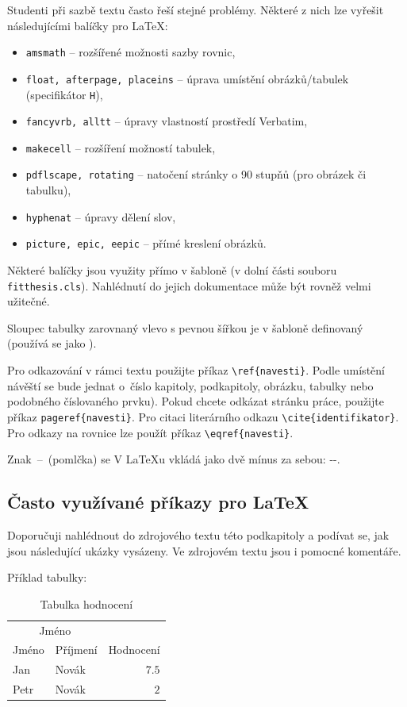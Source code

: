 Studenti při sazbě textu často řeší stejné problémy. Některé z nich lze vyřešit následujícími balíčky pro \LaTeX:

\begin{itemize}
  \item \verb|amsmath| -- rozšířené možnosti sazby rovnic,
  \item \verb|float, afterpage, placeins| -- úprava umístění obrázků/tabulek (specifikátor \texttt{H}),
  \item \verb|fancyvrb, alltt| -- úpravy vlastností prostředí Verbatim, 
  \item \verb|makecell| -- rozšíření možností tabulek,
  \item \verb|pdflscape, rotating| -- natočení stránky o 90 stupňů (pro obrázek či tabulku),
  \item \verb|hyphenat| -- úpravy dělení slov,
  \item \verb|picture, epic, eepic| -- přímé kreslení obrázků.
\end{itemize}

Některé balíčky jsou využity přímo v šabloně (v dolní části souboru \texttt{fitthesis.cls}). Nahlédnutí do jejich dokumentace může být rovněž velmi užitečné.

Sloupec tabulky zarovnaný vlevo s pevnou šířkou je v šabloně definovaný  (používá se jako ).

Pro odkazování v rámci textu použijte příkaz \verb|\ref{navesti}|. Podle umístění návěští se bude jednat o~číslo kapitoly, podkapitoly, obrázku, tabulky nebo podobného číslovaného prvku). Pokud chcete odkázat stránku práce, použijte příkaz \verb|pageref{navesti}|. Pro citaci literárního odkazu \verb|\cite{identifikator}|. Pro odkazy na rovnice lze použít příkaz \verb|\eqref{navesti}|.

Znak \,--\, (pomlčka) se V \LaTeX u vkládá jako dvě mínus za sebou: -{}-.

\subsection*{Často využívané příkazy pro \LaTeX{}}
\label{sec:Fragments}

Doporučuji nahlédnout do zdrojového textu této podkapitoly a podívat se, jak jsou následující ukázky vysázeny. Ve zdrojovém textu jsou i pomocné komentáře.


Příklad tabulky:
\begin{table}[H]
	\vskip6pt
	\caption{Tabulka hodnocení} 
    \vskip6pt
	\centering
	\begin{tabular}{llr}
		\toprule
		\multicolumn{2}{c}{Jméno} \\
		\cmidrule(r){1-2}
		Jméno & Příjmení & Hodnocení \\
		\midrule
		Jan & Novák & $7.5$ \\
		Petr & Novák & $2$ \\
		\bottomrule
	\end{tabular}
	\label{tab:ExampleTable}
\end{table}

